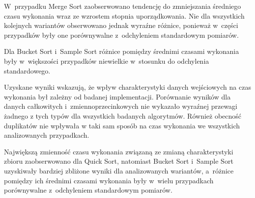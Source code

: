 W~przypadku Merge Sort zaobserwowano tendencję do zmniejszania średniego czasu wykonania wraz ze wzrostem stopnia uporządkowania.
Nie dla wszystkich kolejnych wariantów obserwowano jednak wyraźne różnice, 
ponieważ w~części przypadków były one porównywalne z~odchyleniem standardowym pomiarów.

Dla Bucket Sort i~Sample Sort różnice pomiędzy średnimi czasami wykonania były 
w~większości przypadków niewielkie w~stosunku do odchylenia standardowego.

Uzyskane wyniki wskazują, że wpływ charakterystyki danych wejściowych na czas wykonania był zależny od badanej implementacji.
Porównanie wyników dla danych całkowitych i~zmiennoprzecinkowych nie wykazało wyraźnej przewagi 
żadnego z tych typów dla wszystkich badanych algorytmów. 
Również obecność duplikatów nie wpływała w taki sam sposób na czas wykonania we wszystkich analizowanych przypadkach.

Największą zmienność czasu wykonania związaną ze zmianą charakterystyki zbioru zaobserwowano dla Quick Sort, natomiast Bucket Sort
i~Sample Sort uzyskiwały bardziej zbliżone wyniki dla analizowanych wariantów,
a~różnice pomiędzy ich średnimi czasami wykonania były w~wielu przypadkach porównywalne z~odchyleniem standardowym pomiarów.